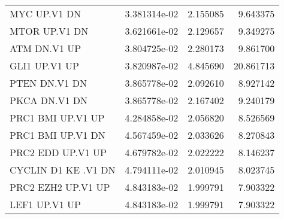 \begin{tabular}{lrrr}
                      MYC UP.V1 DN &      3.381314e-02 &  2.155085 &        9.643375 \\
                     MTOR UP.V1 DN &      3.621661e-02 &  2.129657 &        9.349275 \\
                      ATM DN.V1 UP &      3.804725e-02 &  2.280173 &        9.861700 \\
                     GLI1 UP.V1 UP &      3.820987e-02 &  4.845690 &       20.861713 \\
                     PTEN DN.V1 DN &      3.865778e-02 &  2.092610 &        8.927142 \\
                     PKCA DN.V1 DN &      3.865778e-02 &  2.167402 &        9.240179 \\
                 PRC1 BMI UP.V1 UP &      4.284858e-02 &  2.056820 &        8.526569 \\
                 PRC1 BMI UP.V1 DN &      4.567459e-02 &  2.033626 &        8.270843 \\
                 PRC2 EDD UP.V1 UP &      4.679782e-02 &  2.022222 &        8.146237 \\
               CYCLIN D1 KE .V1 DN &      4.794111e-02 &  2.010945 &        8.023745 \\
                PRC2 EZH2 UP.V1 UP &      4.843183e-02 &  1.999791 &        7.903322 \\
                     LEF1 UP.V1 UP &      4.843183e-02 &  1.999791 &        7.903322 \\
\bottomrule
\end{tabular}
